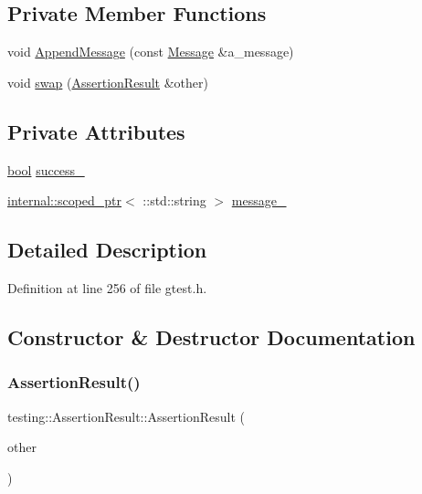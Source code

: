 \subsection*{Private Member Functions}
\begin{DoxyCompactItemize}
\item 
void \hyperlink{classtesting_1_1AssertionResult_a5b55e01f1321d744a594dbe51d46a139}{Append\+Message} (const \hyperlink{classtesting_1_1Message}{Message} \&a\+\_\+message)
\item 
void \hyperlink{classtesting_1_1AssertionResult_ab5b92c1be40f9ce9d7c3e0cf7bf65c61}{swap} (\hyperlink{classtesting_1_1AssertionResult}{Assertion\+Result} \&other)
\end{DoxyCompactItemize}
\subsection*{Private Attributes}
\begin{DoxyCompactItemize}
\item 
\hyperlink{classbool}{bool} \hyperlink{classtesting_1_1AssertionResult_ae7348f9fffe7a20980dfc94fc261d7ca}{success\+\_\+}
\item 
\hyperlink{classtesting_1_1internal_1_1scoped__ptr}{internal\+::scoped\+\_\+ptr}$<$ \+::std\+::string $>$ \hyperlink{classtesting_1_1AssertionResult_a5dee995939457def35f0bf496d070957}{message\+\_\+}
\end{DoxyCompactItemize}


\subsection{Detailed Description}


Definition at line 256 of file gtest.\+h.



\subsection{Constructor \& Destructor Documentation}
\mbox{\label{classtesting_1_1AssertionResult_a27788116f03f90aec4daf592fd809ead}} 
\subsubsection{\texorpdfstring{Assertion\+Result()}{AssertionResult()}\hspace{0.1cm}{\footnotesize\ttfamily [1/2]}}
{\footnotesize\ttfamily testing\+::\+Assertion\+Result\+::\+Assertion\+Result (\begin{DoxyParamCaption}\item[{const \hyperlink{classtesting_1_1AssertionResult}{Assertion\+Result} \&}]{other }\end{DoxyParamCaption})}



